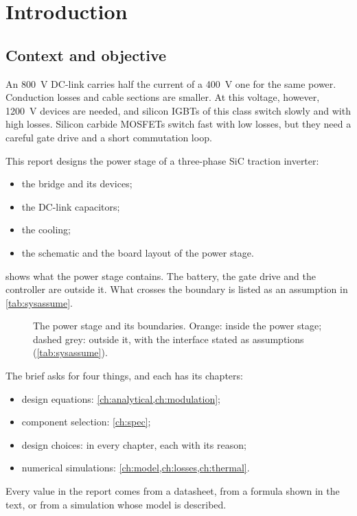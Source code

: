 \chapter{Introduction}
\label{ch:intro}

\section{Context and objective}

An \SI{800}{\volt} DC-link carries half the current of a \SI{400}{\volt} one
for the same power. Conduction losses and cable sections are smaller. At this
voltage, however, \SI{1200}{\volt} devices are needed, and silicon IGBTs of
this class switch slowly and with high losses. Silicon carbide MOSFETs switch
fast with low losses, but they need a careful gate drive and a short
commutation loop.

This report designs the power stage of a three-phase SiC traction inverter:
\begin{itemize}
  \item the bridge and its devices;
  \item the DC-link capacitors;
  \item the cooling;
  \item the schematic and the board layout of the power stage.
\end{itemize}
 shows what the power stage contains. The battery, the gate
drive and the controller are outside it. What crosses the boundary is listed
as an assumption in \cref{tab:sysassume}.

\begin{figure}[H]
\centering

\caption{The power stage and its boundaries. Orange: inside the power stage;
dashed grey: outside it, with the interface stated as assumptions
(\cref{tab:sysassume}).}
\label{fig:system}
\end{figure}

The brief asks for four things, and each has its chapters:
\begin{itemize}
  \item design equations: \cref{ch:analytical,ch:modulation};
  \item component selection: \cref{ch:spec};
  \item design choices: in every chapter, each with its reason;
  \item numerical simulations: \cref{ch:model,ch:losses,ch:thermal}.
\end{itemize}
Every value in the report comes from a datasheet, from a formula shown in the
text, or from a simulation whose model is described.


